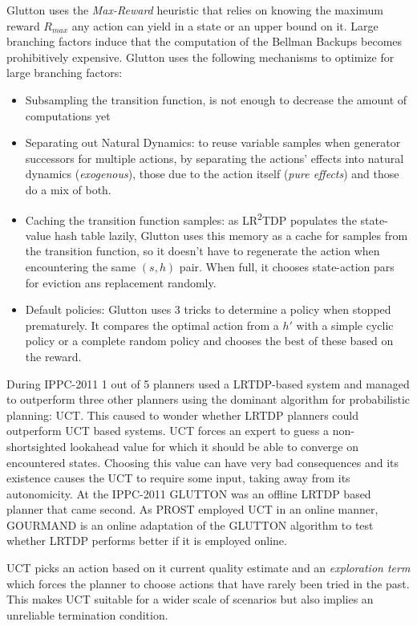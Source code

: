 \documentclass[runningheads,a4paper]{llncs}
\begin{document}
Glutton uses the \emph{Max-Reward} heuristic that relies on knowing the maximum reward $R_{max}$ any action can yield in a state or an upper bound on it. Large branching factors induce that the computation of the Bellman Backups becomes prohibitively expensive. Glutton uses the following mechanisms to optimize for large branching factors:

\begin{itemize}
	\item Subsampling the transition function, is not enough to decrease the amount of computations yet
	\item Separating out Natural Dynamics: to reuse variable samples when generator successors for multiple actions, by separating the actions' effects into natural dynamics (\emph{exogenous}), those due to the action itself (\emph{pure effects}) and those do a mix of both.
	\item Caching the transition function samples: as LR\textsuperscript{2}TDP populates the state-value hash table lazily, Glutton uses  this memory as a cache for samples from the transition function, so it doesn't have to regenerate the action when encountering the same $(s,h)$ pair. When full, it chooses state-action pars for eviction ans replacement randomly.
	\item Default policies: Glutton uses 3 tricks to determine a policy when stopped prematurely. It compares the optimal action from a $h'$ with a simple cyclic policy or a complete random policy and chooses the best of these based on the reward.
\end{itemize}

During IPPC-2011 1 out of 5 planners used a LRTDP-based system and managed to outperform three other planners using the dominant algorithm for probabilistic planning: UCT. This caused to wonder whether LRTDP planners could outperform UCT based systems.  UCT forces an expert to guess a non-shortsighted lookahead value for which it should be able to converge on encountered states. Choosing this value can have very bad consequences and its existence causes the UCT to require some input, taking away from its autonomicity. At the IPPC-2011 GLUTTON was an offline LRTDP based planner that came second. As PROST employed UCT in an online manner, GOURMAND is an online adaptation of the GLUTTON algorithm to test whether LRTDP performs better if it is employed online.

UCT picks an action based on it current quality estimate and an \emph{exploration term} which forces the planner to choose actions that have rarely been tried in the past. This makes UCT suitable for a wider scale of scenarios but also implies an unreliable termination condition.
\end{document}
